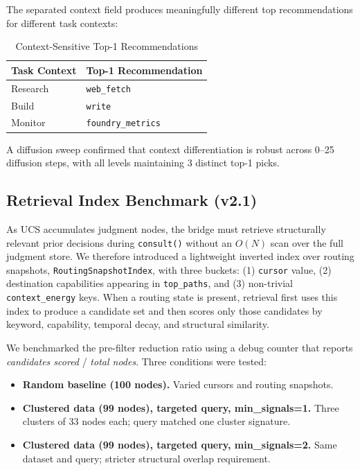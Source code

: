 \documentclass[11pt,a4paper]{article}
\begin{document}
The separated context field produces meaningfully different top
recommendations for different task contexts:

\begin{table}[h]
\centering
\caption{Context-Sensitive Top-1 Recommendations}
\label{tab:context}
\begin{tabular}{@{}ll@{}}
\toprule
\textbf{Task Context} & \textbf{Top-1 Recommendation} \\
\midrule
Research & \texttt{web\_fetch} \\
Build & \texttt{write} \\
Monitor & \texttt{foundry\_metrics} \\
\bottomrule
\end{tabular}
\end{table}

A diffusion sweep confirmed that context differentiation is robust
across 0--25 diffusion steps, with all levels maintaining 3 distinct
top-1 picks.

\subsection{Retrieval Index Benchmark (v2.1)}

As UCS accumulates judgment nodes, the bridge must retrieve structurally
relevant prior decisions during \texttt{consult()} without an $O(N)$ scan
over the full judgment store. We therefore introduced a lightweight
inverted index over routing snapshots, \texttt{RoutingSnapshotIndex}, with
three buckets: (1) \texttt{cursor} value, (2) destination capabilities
appearing in \texttt{top\_paths}, and (3) non-trivial \texttt{context\_energy}
keys. When a routing state is present, retrieval first uses this index to
produce a candidate set and then scores only those candidates by keyword,
capability, temporal decay, and structural similarity.

We benchmarked the pre-filter reduction ratio using a debug counter that
reports \emph{candidates scored} / \emph{total nodes}. Three conditions were
tested:

\begin{itemize}[leftmargin=*]
\item \textbf{Random baseline (100 nodes).} Varied cursors and routing snapshots.
\item \textbf{Clustered data (99 nodes), targeted query, min\_signals=1.} Three
  clusters of 33 nodes each; query matched one cluster signature.
\item \textbf{Clustered data (99 nodes), targeted query, min\_signals=2.} Same
  dataset and query; stricter structural overlap requirement.
\end{itemize}
\end{document}
